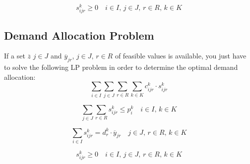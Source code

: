 \documentclass[a4paper,12pt,titlepage]{article}
\begin{document}
\begin{equation*}
s_{ijr}^k\geq 0 \quad i\in I,\,j\in J,\, r\in R,\,k\in K
\tag{8}
\end{equation*}



\subsection*{Demand Allocation Problem}
If a set $\overline{z}$ $j\in J$ and $\overline{y}_{jr}$, $j\in J,\,r\in R$ of feasible values is available, you just have to solve the following LP problem in order to determine the optimal demand allocation:
\begin{equation*}
\sum_{i\in I}\sum_{j\in J}\sum_{r\in R}\sum_{k\in K} c_{ijr}^k \cdot s_{ijr}^k 
\end{equation*}

\begin{equation*}
\sum_{j\in J}\sum_{r\in R} s_{ijr}^k  \leq p_i^k \quad i\in I,\,k\in K
\end{equation*}

\begin{equation*}
\sum_{i\in I} s_{ijr}^k = d_r^k \cdot \overline{y}_{jr} \quad j\in J,\,r\in R,\,k\in K
\end{equation*}

\begin{equation*}
s_{ijr}^k\geq 0 \quad i\in I,\,j\in J,\, r\in R,\,k\in K
\end{equation*}
\end{document}
